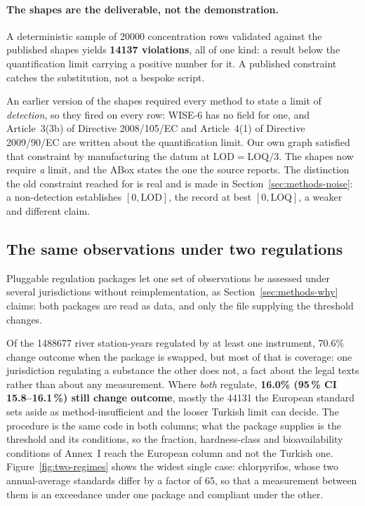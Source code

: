 \paragraph{The shapes are the deliverable, not the demonstration.}
A deterministic sample of \num{20000} concentration rows validated against the
published shapes yields \textbf{\num{14137} violations}, all of one kind: a
result below the quantification limit carrying a positive number for it. A
published constraint catches the substitution, not a bespoke script.

An earlier version of the shapes required every method to state a limit of
\emph{detection}, so they fired on every row: WISE-6 has no field for one, and
Article~3(3b) of Directive 2008/105/EC and Article~4(1) of Directive 2009/90/EC
are written about the quantification limit. Our own graph satisfied that
constraint by manufacturing the datum at $\mathrm{LOD}=\mathrm{LOQ}/3$. The
shapes now require \emph{a} limit, and the ABox states the one the source
reports. The distinction the old constraint reached for is real and is made in
Section~\ref{sec:methods-noise}: a non-detection establishes
$[0,\mathrm{LOD}]$, the record at best $[0,\mathrm{LOQ}]$, a weaker and
different claim.

\subsection{The same observations under two regulations}
\label{sec:results-dual}
Pluggable regulation packages let one set of observations be assessed under
several jurisdictions without
reimplementation, as
Section~\ref{sec:methods-why} claims: both packages are read as data, and only
the file supplying the threshold changes.

Of the \num{1488677} river station-years regulated by at least one instrument,
\num{70.6}\% change outcome when the package is swapped, but most of that is
coverage: one jurisdiction regulating a substance the other does not, a fact
about the legal texts rather than about any measurement. Where \emph{both}
regulate, \textbf{\num{16.0}\% (95\,\% CI \num{15.8}--\num{16.1}\,\%) still
change outcome}, mostly the \num{44131} the European standard sets aside as
method-insufficient and the looser Turkish limit can decide. The procedure is
the same code in both columns; what the package supplies is the threshold and
its conditions, so the fraction, hardness-class and bioavailability conditions
of Annex~I reach the European column and not the Turkish one. Figure~\ref{fig:two-regimes} shows the widest single case:
chlorpyrifos, whose two annual-average standards differ by a factor of
\num{65}, so that a measurement between them is an exceedance under one package
and compliant under the other.

